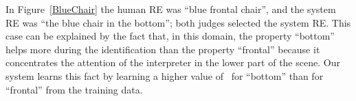 In Figure~\ref{BlueChair} the human RE was ``blue frontal chair'', and the system RE was ``the blue chair in the bottom''; both judges selected the system RE. This case can be explained by the fact that, in this domain, the property ``bottom'' helps more during the identification than the property ``frontal'' because it concentrates the attention of the interpreter in the lower part of the scene. Our system learns this fact by learning a higher value of \puse~for ``bottom'' than for ``frontal'' from the training data. 



